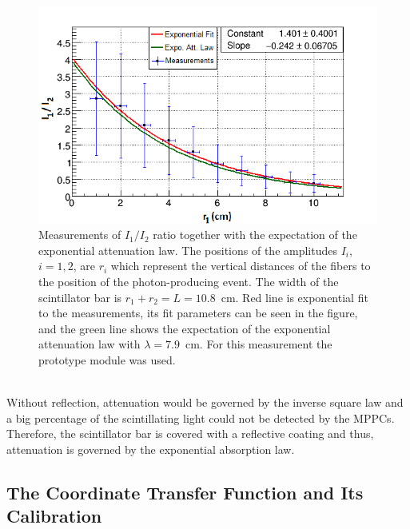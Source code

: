 \documentclass[a4paper]{article}\linespread{1.4}
\begin{document}
\begin{figure}[h!] \hspace*{0cm} \includegraphics[width=130mm,scale=2.0]{effofre.png} \caption{Measurements of $I_{1} / I_{2}$ ratio together with the expectation of the exponential attenuation law.  
The positions of the amplitudes $I_{i}$, $i=1,2$, are  $r_{i}$ which represent the vertical distances of the fibers to the position of the photon-producing event. The width of the scintillator bar is $ r_{1} + r_{2}=L=10.8$~cm. Red line is exponential fit to the measurements, its fit parameters can be seen in the figure, and the green line shows the expectation of the exponential attenuation law with $\lambda=7.9$~cm.
For this measurement the prototype module was used. } \label{fig:gull1} \end{figure}
\\Without reflection, attenuation would be governed by the inverse square law and a big percentage of the scintillating light could not be detected by the MPPCs. Therefore, the scintillator bar is covered with a reflective coating and thus, attenuation is governed by the exponential absorption law. 


\subsection{The Coordinate Transfer Function and Its Calibration}
\label{chap:mu}
\end{document}

